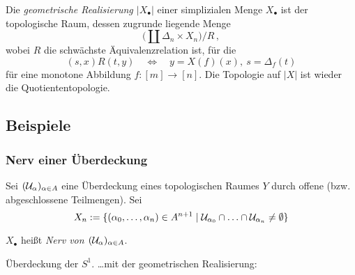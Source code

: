 \begin{definition}
  Die \emph{geometrische Realisierung $|X_\bullet|$} einer simplizialen Menge
  $X_\bullet$ ist der topologische Raum, dessen zugrunde liegende Menge
  \[ \big( \coprod \Delta_n \times X_n \big) \big/ R\,,\]
  wobei $R$ die schwächste Äquivalenzrelation ist, für die
  \[ (s,x) R (t,y) \quad\Leftrightarrow\quad 
    y = X(f)(x),\ s = \Delta_f(t)\]
  für eine monotone Abbildung $f:[m]\to [n]$. Die Topologie auf $|X|$ ist
  wieder die Quotiententopologie.
\end{definition}

\subsection{Beispiele}
\subsubsection{Nerv einer Überdeckung}

Sei $(\mathcal{U}_\alpha)_{\alpha \in A}$ eine Überdeckung eines topologischen Raumes
$Y$ durch offene (bzw. abgeschlossene Teilmengen). Sei
\[ X_n := \{ (\alpha_0, \ldots, \alpha_n) \in A^{n+1} \mid 
  \mathcal{U}_{\alpha_0} \cap \ldots \cap \mathcal{U}_{\alpha_n} \neq \emptyset \}\]

\begin{definition}
  $X_\bullet$ heißt \emph{Nerv von $(\mathcal{U}_\alpha)_{\alpha\in A}$}.
\end{definition}

\begin{beispiel}
  \Bild Überdeckung der $S^1$.
  \ldots mit der geometrischen Realisierung:
  \begin{center}
  \end{center}
\end{beispiel}

